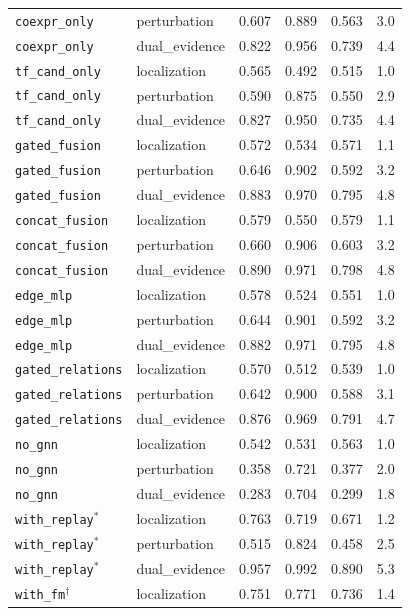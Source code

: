 \documentclass{article}
\theoremstyle{plain}
\theoremstyle{definition}
\begin{document}
\begin{table}[h]
\begin{center}
\begin{small}
\begin{tabular}{llcccc}
\texttt{coexpr\_only} & perturbation & 0.607 & 0.889 & 0.563 & 3.0 \\
\texttt{coexpr\_only} & dual\_evidence & 0.822 & 0.956 & 0.739 & 4.4 \\
\texttt{tf\_cand\_only} & localization & 0.565 & 0.492 & 0.515 & 1.0 \\
\texttt{tf\_cand\_only} & perturbation & 0.590 & 0.875 & 0.550 & 2.9 \\
\texttt{tf\_cand\_only} & dual\_evidence & 0.827 & 0.950 & 0.735 & 4.4 \\
\texttt{gated\_fusion} & localization & 0.572 & 0.534 & 0.571 & 1.1 \\
\texttt{gated\_fusion} & perturbation & 0.646 & 0.902 & 0.592 & 3.2 \\
\texttt{gated\_fusion} & dual\_evidence & 0.883 & 0.970 & 0.795 & 4.8 \\
\texttt{concat\_fusion} & localization & 0.579 & 0.550 & 0.579 & 1.1 \\
\texttt{concat\_fusion} & perturbation & 0.660 & 0.906 & 0.603 & 3.2 \\
\texttt{concat\_fusion} & dual\_evidence & 0.890 & 0.971 & 0.798 & 4.8 \\
\texttt{edge\_mlp} & localization & 0.578 & 0.524 & 0.551 & 1.0 \\
\texttt{edge\_mlp} & perturbation & 0.644 & 0.901 & 0.592 & 3.2 \\
\texttt{edge\_mlp} & dual\_evidence & 0.882 & 0.971 & 0.795 & 4.8 \\
\texttt{gated\_relations} & localization & 0.570 & 0.512 & 0.539 & 1.0 \\
\texttt{gated\_relations} & perturbation & 0.642 & 0.900 & 0.588 & 3.1 \\
\texttt{gated\_relations} & dual\_evidence & 0.876 & 0.969 & 0.791 & 4.7 \\
\texttt{no\_gnn} & localization & 0.542 & 0.531 & 0.563 & 1.0 \\
\texttt{no\_gnn} & perturbation & 0.358 & 0.721 & 0.377 & 2.0 \\
\texttt{no\_gnn} & dual\_evidence & 0.283 & 0.704 & 0.299 & 1.8 \\
\texttt{with\_replay}$^*$ & localization & 0.763 & 0.719 & 0.671 & 1.2 \\
\texttt{with\_replay}$^*$ & perturbation & 0.515 & 0.824 & 0.458 & 2.5 \\
\texttt{with\_replay}$^*$ & dual\_evidence & 0.957 & 0.992 & 0.890 & 5.3 \\
\texttt{with\_fm}$^\dagger$ & localization & 0.751 & 0.771 & 0.736 & 1.4 \\

\end{tabular}
\end{small}
\end{center}
\end{table}
\end{document}
